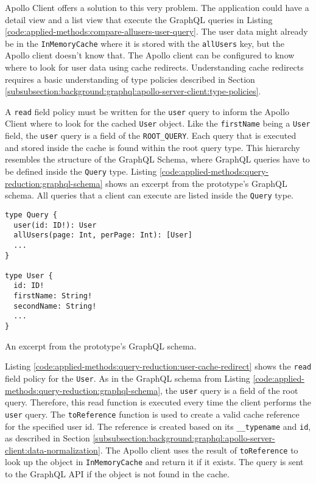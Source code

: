 \noindent Apollo Client offers a solution to this very problem. The application could have a detail view and a list view that execute the GraphQL queries in Listing \ref{code:applied-methods:compare-allusers-user-query}. The user data might already be in the \texttt{InMemoryCache} where it is stored with the \texttt{allUsers} key, but the Apollo client doesn't know that. The Apollo client can be configured to know where to look for user data using cache redirects. Understanding cache redirects requires a basic understanding of type policies described in Section \ref{subsubsection:background:graphql:apollo-server-client:type-policies}.

\bigskip

\noindent A \texttt{read} field policy must be written for the \texttt{user} query to inform the Apollo Client where to look for the cached \texttt{User} object. Like the \texttt{firstName} being a \texttt{User} field, the \texttt{user} query is a field of the \texttt{ROOT\_QUERY}. Each query that is executed and stored inside the cache is found within the root query type. This hierarchy resembles the structure of the GraphQL Schema, where GraphQL queries have to be defined inside the \texttt{Query} type. Listing \ref{code:applied-methods:query-reduction:graphql-schema} shows an excerpt from the prototype's GraphQL schema. All queries that a client can execute are listed inside the \texttt{Query} type.

\ifshowListings
\begin{listing}[H]
  \begin{verbatim}
type Query {
  user(id: ID!): User
  allUsers(page: Int, perPage: Int): [User]
  ...
}

type User {
  id: ID!
  firstName: String!
  secondName: String!
  ...
}
  \end{verbatim}
  \caption{An excerpt from the prototype's GraphQL schema.}\label{code:applied-methods:query-reduction:graphql-schema}
\end{listing}
\fi


\noindent Listing \ref{code:applied-methods:query-reduction:user-cache-redirect} shows the \texttt{read} field policy for the \texttt{User}. As in the GraphQL schema from Listing \ref{code:applied-methods:query-reduction:graphql-schema}, the \texttt{user} query is a field of the root query. Therefore, this read function is executed every time the client performs the \texttt{user} query. The \texttt{toReference} function is used to create a valid cache reference for the specified user id. The reference is created based on its \texttt{\_\_typename} and \texttt{id}, as described in Section \ref{subsubsection:background:graphql:apollo-server-client:data-normalization}. The Apollo client uses the result of \texttt{toReference} to look up the object in \texttt{InMemoryCache} and return it if it exists. The query is sent to the GraphQL \ac{API} if the object is not found in the cache.


